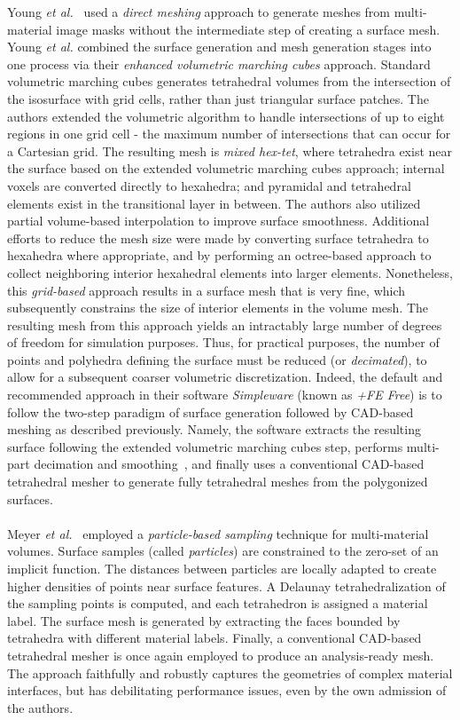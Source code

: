 %
Young \textit{et al.}~\cite{young_2008} used a \textit{direct meshing} approach to generate meshes from multi-material image masks without the intermediate step of creating a surface mesh. Young \textit{et al.} combined the surface generation and mesh generation stages into one process via their \textit{enhanced volumetric marching cubes} approach. Standard volumetric marching cubes generates tetrahedral volumes from the intersection of the isosurface with grid cells, rather than just triangular surface patches. The authors extended the volumetric algorithm to handle intersections of up to eight regions in one grid cell - the maximum number of intersections that can occur for a Cartesian grid. The resulting mesh is \textit{mixed hex-tet}, where tetrahedra exist near the surface based on the extended volumetric marching cubes approach; internal voxels are converted directly to hexahedra; and pyramidal and tetrahedral elements exist in the transitional layer in between. The authors also utilized partial volume-based interpolation to improve surface smoothness. Additional efforts to reduce the mesh size were made by converting surface tetrahedra to hexahedra where appropriate, and by performing an octree-based approach to collect neighboring interior hexahedral elements into larger elements. Nonetheless, this \textit{grid-based} approach results in a surface mesh that is very fine, which subsequently constrains the size of interior elements in the volume mesh. The resulting mesh from this approach yields an intractably large number of degrees of freedom for simulation purposes. Thus, for practical purposes, the number of points and polyhedra defining the surface must be reduced (or \textit{decimated}), to allow for a subsequent coarser volumetric discretization. Indeed, the default and recommended approach in their software \textit{Simpleware} (known as \textit{+FE Free}) is to follow the two-step paradigm of surface generation followed by CAD-based meshing as described previously. Namely, the software extracts the resulting surface following the extended volumetric marching cubes step, performs multi-part decimation and smoothing~\cite{egst}, and finally uses a conventional CAD-based tetrahedral mesher to generate fully tetrahedral meshes from the polygonized surfaces. \\ \\
%
Meyer \textit{et al.}~\cite{meyer_2008} employed a \textit{particle-based sampling} technique for multi-material volumes. Surface samples (called \textit{particles}) are constrained to the zero-set of an implicit function. The distances between particles are locally adapted to create higher densities of points near surface features. A Delaunay tetrahedralization of the sampling points is computed, and each tetrahedron is assigned a material label. The surface mesh is generated by extracting the faces bounded by tetrahedra with different material labels. Finally, a conventional CAD-based tetrahedral mesher is once again employed to produce an analysis-ready mesh. The approach faithfully and robustly captures the geometries of complex material interfaces, but has debilitating performance issues, even by the own admission of the authors. \\ \\
